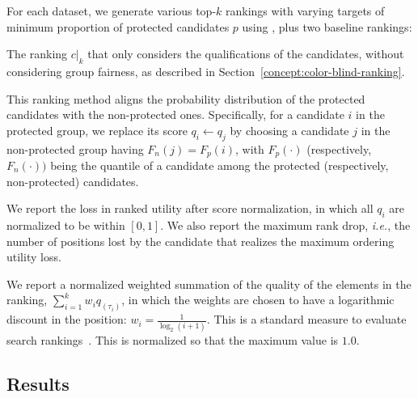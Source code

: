 For each dataset, we generate various top-$k$ rankings with varying targets of minimum proportion of protected candidates $p$ using \algoFAIR, plus two baseline rankings:

 The ranking $c|_k$ that only considers the qualifications of the candidates, without considering group fairness, as described in Section~\ref{concept:color-blind-ranking}.

 This ranking method aligns the probability distribution of the protected candidates with the non-protected ones. Specifically, for a candidate $i$ in the protected group, we replace its score $q_i \leftarrow q_j$ by choosing a candidate $j$ in the non-protected group having $F_n(j) = F_p(i)$, with $F_p(\cdot)$ (respectively, $F_n(\cdot))$ being the quantile of a candidate among the protected (respectively, non-protected) candidates.

 We report the loss in ranked utility after score normalization, in which all $q_i$ are normalized to be within $[0, 1]$.
%
We also report the maximum rank drop, {\em i.e.}, the number of positions lost by the candidate that realizes the maximum ordering utility loss.

%
We report a normalized weighted summation of the quality of the elements in the ranking, $\sum_{i=1}^{k} w_i q_{(\tau_i)}$, in which the weights are chosen to have a logarithmic discount in the position:  $w_i = \frac{1}{\log_2 (i+1)}$. This is a standard measure to evaluate search rankings~\cite{jarvelin2002cumulated}.
%
This is normalized so that the maximum value is $1.0$.

\subsection{Results}\label{sec:experiments-results}

